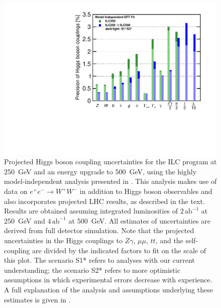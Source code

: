 \documentclass[%
reprint,
 floatfix,
 amsmath,amssymb,
 aps,
]{revtex4-1}
\def\ee{e^+e^-}
\begin{document}
\begin{figure}
\begin{center}
\includegraphics[width=0.99\hsize]{figures/ModelindepSummary.pdf}
\caption{Projected Higgs boson coupling uncertainties for the ILC
  program at 250~GeV and an energy upgrade to 500~GeV, using the
  highly model-independent analysis presented in \cite{Barklow:2017suo}. This  analysis makes use of  data on $\ee\to W^+W^-$ in addition to Higgs boson observables and also incorporates projected LHC results, as described  in the text. Results are obtained assuming integrated luminosities of $2\,{\mathrm{ab}}^{-1}$ at 250~GeV and $4\,{\mathrm{ab}}^{-1}$ at 500~GeV. All estimates of uncertainties are derived from full detector simulation. Note that the projected uncertainties in the Higgs couplings to $Z\gamma$, $\mu\mu$, $tt$, and the self-coupling are divided by the indicated factors to fit on the scale of this plot. The scenario S1* refers to analyses with our current understanding; the scenario S2* refers to more optimistic assumptions in which experimental errors decrease with experience.   A full explanation of the analysis and assumptions underlying these estimates is given in \cite{ILCforESS}.}
\label{fig:ILCmodelindep}
\end{center}
\vspace{-0.7cm}
\end{figure}
\end{document}
